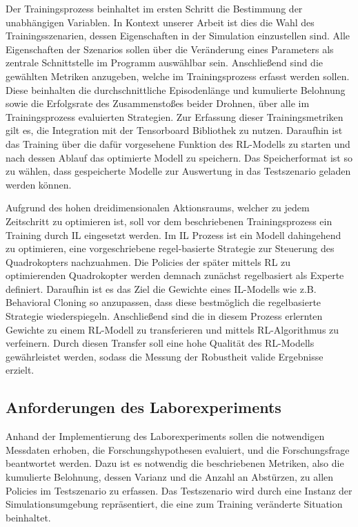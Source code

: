 Der Trainingsprozess beinhaltet im ersten Schritt die Bestimmung der unabhängigen Variablen. 
In Kontext unserer Arbeit ist dies die Wahl des Trainingsszenarien, dessen Eigenschaften in der Simulation einzustellen sind.
Alle Eigenschaften der Szenarios sollen über die Veränderung eines Parameters als zentrale Schnittstelle im Programm auswählbar sein.
Anschließend sind die gewählten Metriken anzugeben, welche im Trainingsprozess erfasst werden sollen.
Diese beinhalten die durchschnittliche Episodenlänge und kumulierte Belohnung sowie die Erfolgsrate des Zusammenstoßes beider Drohnen, über alle im Trainingsprozess evaluierten Strategien.
Zur Erfassung dieser Trainingsmetriken gilt es, die Integration mit der Tensorboard Bibliothek zu nutzen.
Daraufhin ist das Training über die dafür vorgesehene Funktion des RL-Modells zu starten und nach dessen Ablauf das optimierte Modell zu speichern.
Das Speicherformat ist so zu wählen, dass gespeicherte Modelle zur Auswertung in das Testszenario geladen werden können.

Aufgrund des hohen dreidimensionalen Aktionsraums, welcher zu jedem Zeitschritt zu optimieren ist, soll vor dem beschriebenen Trainingsprozess ein Training durch IL eingesetzt werden.
Im IL Prozess ist ein Modell dahingehend zu optimieren, eine vorgeschriebene regel-basierte Strategie zur Steuerung des Quadrokopters nachzuahmen. 
Die Policies der später mittels RL zu optimierenden Quadrokopter werden demnach zunächst regelbasiert als Experte definiert. 
Daraufhin ist es das Ziel die Gewichte eines IL-Modells wie z.B. Behavioral Cloning so anzupassen, dass diese bestmöglich die regelbasierte Strategie wiederspiegeln.
Anschließend sind die in diesem Prozess erlernten Gewichte zu einem RL-Modell zu transferieren und mittels RL-Algorithmus zu verfeinern.
Durch diesen Transfer soll eine hohe Qualität des RL-Modells gewährleistet werden, sodass die Messung der Robustheit valide Ergebnisse erzielt.

\subsection{Anforderungen des Laborexperiments}

Anhand der Implementierung des Laborexperiments sollen die notwendigen Messdaten erhoben, die Forschungshypothesen evaluiert, und die Forschungsfrage beantwortet werden.
Dazu ist es notwendig die beschriebenen Metriken, also die kumulierte Belohnung, dessen Varianz und die Anzahl an Abstürzen, zu allen Policies im Testszenario zu erfassen.
Das Testszenario wird durch eine Instanz der Simulationsumgebung repräsentiert, die eine zum Training veränderte Situation beinhaltet.

